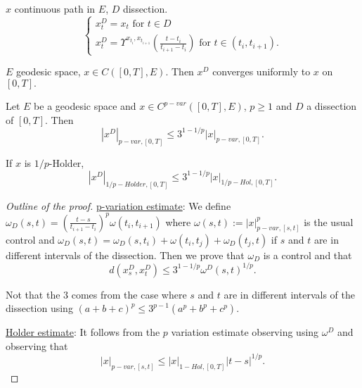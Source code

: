 \begin{definition}[PL approximations]
    $x$ continuous path in $E$, $D$ dissection.
    \begin{equation}
        \begin{cases}
            x^D_t = x_t \text{ for } t \in D \\
            x^D_t = \Upsilon^{x_{t_i}, x_{t_{i+1}}} \left( \frac{t - t_i}{t_{i+1} - t_i} \right) \text{ for } t \in (t_i, t_{i+1}). 
        \end{cases}
    \end{equation}
\end{definition}

\begin{lemma}
    $E$ geodesic space, $x \in C([0,T],E).$ Then $x^D$ converges uniformly to $x$ on $[0,T].$
\end{lemma}

\begin{proposition}
    Let $E$ be a geodesic space and $x \in C^{p-var}([0,T], E)$, $p \ge 1$ and $D$ a dissection of $[0,T]$. Then
    \begin{equation}
        |x^D|_{p-var,[0,T]} \le 3^{1-1/p} |x|_{p-var, [0,T]}.
    \end{equation}

    If $x$ is $1/p$-Holder,
    \begin{equation}
        |x^D|_{1/p-Holder,[0,T]} \le 3^{1-1/p} |x|_{1/p-Hol, [0,T]}.
    \end{equation}
\end{proposition}
\begin{proof}[Outline of the proof]
    \underline{p-variation estimate}:
    We define $\omega_D(s,t) = \left( \frac{t - s}{t_{i+1} - t_i} \right)^p \omega(t_i, t_{i+1})$ where $\omega(s,t) := |x|_{p-var,[s,t]}^p$ is the usual control and $\omega_D(s,t) = \omega_D(s,t_i) + \omega(t_i,t_j) + \omega_D(t_j,t)$ if $s$ and $t$ are in different intervals of the dissection.
    Then we prove that $\omega_D$ is a control and that 
    \begin{equation}
        d(x_s^D, x_t^D) \le 3^{1 - 1/p} \omega^D(s,t)^{1/p}.
    \end{equation}

    Not that the $3$ comes from the case where $s$ and $t$ are in different intervals of the dissection using $(a + b + c)^p \leq 3^{p-1} (a^p + b^p + c^p).$

    \underline{Holder estimate}:
    It follows from the $p$ variation estimate observing using $\omega^D$ and observing that 
    \begin{equation}
        |x|_{p-var,[s,t]} \le |x|_{1-Hol,[0,T]} |t - s|^{1/p}.
    \end{equation}
\end{proof}


